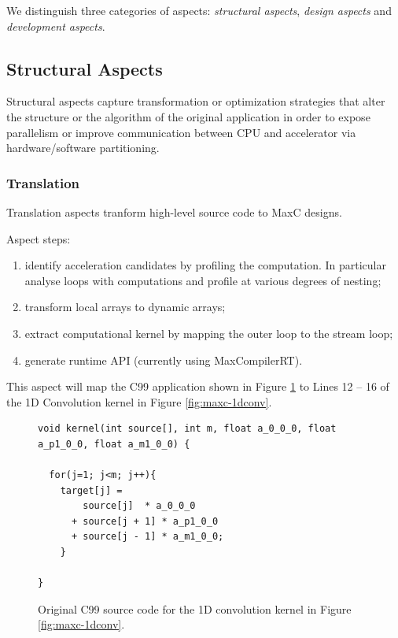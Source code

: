 We distinguish three categories of aspects: \emph{structural aspects},
\emph{design aspects} and \emph{development aspects}.

\subsection{Structural Aspects}

Structural aspects capture transformation or optimization strategies
that alter the structure or the algorithm of the original application
in order to expose parallelism or improve communication between CPU
and accelerator via hardware/software partitioning.

\subsubsection{Translation}

Translation aspects tranform high-level source code to MaxC designs.

Aspect steps:
\begin{enumerate}

\item identify acceleration candidates by profiling the
  computation. In particular analyse loops with computations and
  profile at various degrees of nesting;

\item transform local arrays to dynamic arrays;

\item extract computational kernel by mapping the outer loop to the
  stream loop;

\item generate runtime API (currently using MaxCompilerRT).

\end{enumerate}

This aspect will map the C99 application shown in Figure
\ref{fig:c-design} to Lines 12 -- 16 of the 1D Convolution kernel in
Figure \ref{fig:maxc-1dconv}.


\begin{figure}[!h]
\centering
\begin{lstlisting}
void kernel(int source[], int m, float a_0_0_0, float a_p1_0_0, float a_m1_0_0) {

  for(j=1; j<m; j++){
    target[j] =
        source[j]  * a_0_0_0
      + source[j + 1] * a_p1_0_0
      + source[j - 1] * a_m1_0_0;
    }

}
\end{lstlisting}
\caption{Original C99 source code for the 1D convolution kernel in
  Figure \ref{fig:maxc-1dconv}.}
\label{fig:c-design}
\end{figure}

